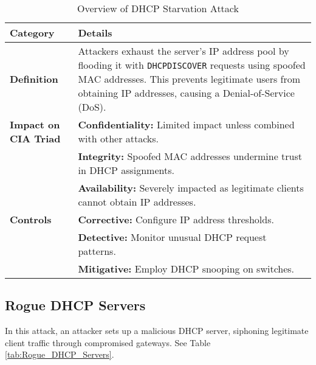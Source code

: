\documentclass[conference]{IEEEtran}
\begin{document}
        \begin{table*}[h!]
            \centering
            \caption{Overview of DHCP Starvation Attack}
            \label{tab:DHCP_Starvation_Attack}
            \begin{tabular}{@{}>{\raggedright}p{3cm} p{10cm}@{}}
                \toprule
                \textbf{Category} & \textbf{Details} \\ 
                \midrule
                \textbf{Definition} & Attackers exhaust the server's IP address pool by flooding it with \texttt{DHCPDISCOVER} requests using spoofed MAC addresses. This prevents legitimate users from obtaining IP addresses, causing a Denial-of-Service (DoS). \\ 
                \midrule
                \textbf{Impact on CIA Triad} & 
                \textbf{Confidentiality:} Limited impact unless combined with other attacks. \\
                & \textbf{Integrity:} Spoofed MAC addresses undermine trust in DHCP assignments. \\
                & \textbf{Availability:} Severely impacted as legitimate clients cannot obtain IP addresses. \\ 
                \midrule
                \textbf{Controls} & 
                \textbf{Corrective:} Configure IP address thresholds. \\
                & \textbf{Detective:} Monitor unusual DHCP request patterns. \\
                & \textbf{Mitigative:} Employ DHCP snooping on switches. \\ 
                \bottomrule
            \end{tabular}
        \end{table*}

    \subsection{Rogue DHCP Servers}
    \label{subsec:Rogue_DHCP_Servers}

        In this attack, an attacker sets up a malicious DHCP server, siphoning legitimate client traffic through compromised gateways. See Table \ref{tab:Rogue_DHCP_Servers}.
\end{document}

